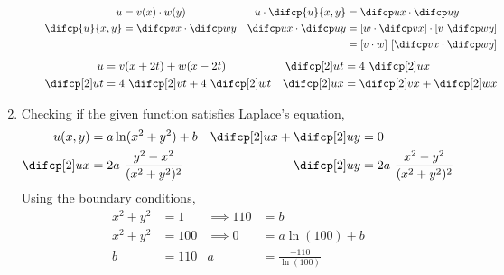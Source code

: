\begin{enumerate}
\begin{enumerate}
                    \begin{align}
                        u                         & = v(x) \cdot w(y)               &
                        u \cdot \difcp{u}{x, y}   & = \difcp ux \cdot \difcp uy       \\
                        \difcp {u}{x,y}           & = \difcp vx \cdot \difcp wy     &
                        \difcp ux \cdot \difcp uy & = [w \cdot \difcp vx]
                        \cdot [v\ \difcp wy]                                          \\
                                                  &                                 &
                                                  & = [v \cdot w]\ [\difcp vx \cdot
                        \difcp wy]
                    \end{align}
                    \begin{align}
                        u            & = v(x+2t) + w(x - 2t)               &
                        \difcp[2] ut & = 4\ \difcp[2] ux                     \\
                        \difcp[2] ut & = 4\ \difcp[2] vt + 4\ \difcp[2] wt &
                        \difcp[2] ux & = \difcp[2] vx + \difcp[2] wx
                    \end{align}
          \end{enumerate}

    \item Checking if the given function satisfies Laplace's equation,
          \begin{align}
              u(x, y)                     & = a \ln(x^2 + y^2) + b &
              \difcp[2] ux + \difcp[2] uy & = 0                      \\
              \difcp[2] ux                & = 2a\ \frac{y^2 - x^2}
              {(x^2 + y^2)^2}             &
              \difcp[2] uy                & = 2a\ \frac{x^2 - y^2}
              {(x^2 + y^2)^2}                                        \\
          \end{align}
          Using the boundary conditions,
          \begin{align}
              x^2 + y^2    & = 1                     &
              \implies 110 & = b                       \\
              x^2 + y^2    & = 100                   &
              \implies 0   & = a\ln(100) + b           \\
              b            & = 110                   &
              a            & = \frac{-110}{\ln(100)}
          \end{align}


\end{enumerate}

